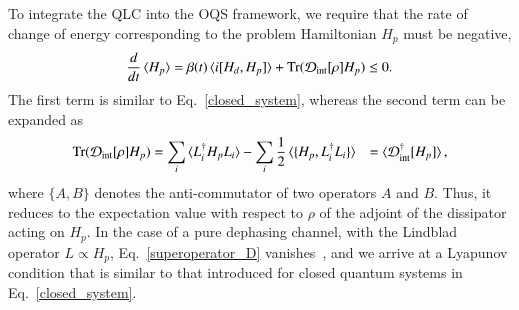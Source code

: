 \documentclass[10pt, superscriptaddress,aps,pra,twocolumn,showpacs,nofootinbib, longbibliography, notitlepage,floatfix]{revtex4-2}
\begin{document}
To integrate the QLC into the OQS framework, we require that the rate of change of energy corresponding to the problem Hamiltonian $H_p$ must be negative,  
\begin{equation}
    \frac{d}{dt} \braket{H_p} = \beta(t)  \braket{i[H_d, H_p]} + \text{Tr}(\mathcal{D}_{\text{int}} [\rho] H_p) \leq 0. \label{open_system}
\end{equation}
The first term is similar to Eq.~\eqref{closed_system}, whereas the second term can be expanded as
\begin{equation}
\begin{split}
    \text{Tr}(\mathcal{D}_{\text{int}} [\rho] H_p) & = \sum_i \braket{ L_i^\dagger H_p L_i } - \sum_i \frac{1}{2} \braket{ \{H_p, L_i^\dagger L_i\} } & =\braket{\mathcal{D_{\text{int}}^{\dagger}}[H_p]},\label{superoperator_D}
\end{split}
\end{equation}
where $\{{A}, {B} \}$ denotes the anti-commutator of two operators ${A}$ and ${B}$. Thus, it reduces to the expectation value with respect to $\rho$ of the adjoint of the dissipator acting on $H_p$.  In the case of a pure dephasing channel, with the Lindblad operator $L \propto H_p$, Eq.~\eqref{superoperator_D} vanishes~\cite{wiseman2010quantum}, and we arrive at a Lyapunov condition that is similar to that introduced for closed quantum systems in Eq.~\eqref{closed_system}.
\end{document}
